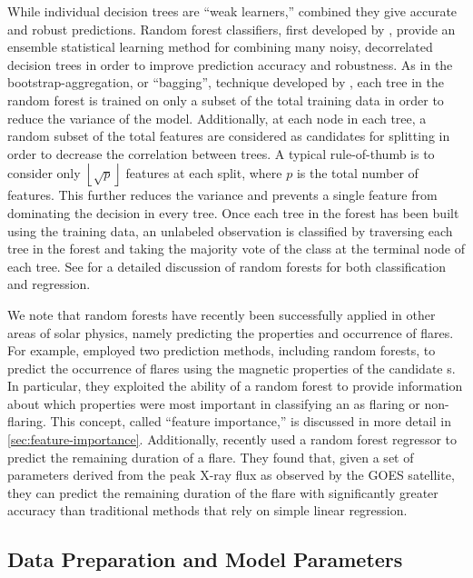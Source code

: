 While individual decision trees are ``weak learners,'' combined they give accurate and robust predictions.
Random forest classifiers, first developed by \citet{breiman_random_2001}, provide an ensemble statistical learning method for combining many noisy, decorrelated decision trees in order to improve prediction accuracy and robustness.
As in the bootstrap-aggregation, or ``bagging'', technique developed by \citet{breiman_bagging_1996}, each tree in the random forest is trained on only a subset of the total training data in order to reduce the variance of the model.
Additionally, at each node in each tree, a random subset of the total features are considered as candidates for splitting in order to decrease the correlation between trees.
A typical rule-of-thumb is to consider only $\left\lfloor\sqrt{p}\right\rfloor$ features at each split, where $p$ is the total number of features.
This further reduces the variance and prevents a single feature from dominating the decision in every tree.
Once each tree in the forest has been built using the training data, an unlabeled observation is classified by traversing each tree in the forest and taking the majority vote of the class at the terminal node of each tree.
See \citet[chapter 15]{hastie_elements_2009} for a detailed discussion of random forests for both classification and regression.

We note that random forests have recently been successfully applied in other areas of solar physics, namely predicting the properties and occurrence of flares.
For example, \citet{campi_feature_2019} employed two prediction methods, including random forests, to predict the occurrence of flares using the magnetic properties of the candidate \AR s.
In particular, they exploited the ability of a random forest to provide information about which properties were most important in classifying an \AR{} as flaring or non-flaring.
This concept, called ``feature importance,'' is discussed in more detail in \autoref{sec:feature-importance}.
Additionally, \citet{reep_forecasting_2021} recently used a random forest regressor to predict the remaining duration of a flare.
They found that, given a set of parameters derived from the peak X-ray flux as observed by the GOES satellite, they can predict the remaining duration of the flare with significantly greater accuracy than traditional methods that rely on simple linear regression.

\subsection{Data Preparation and Model Parameters}\label{sec:data-prep}

